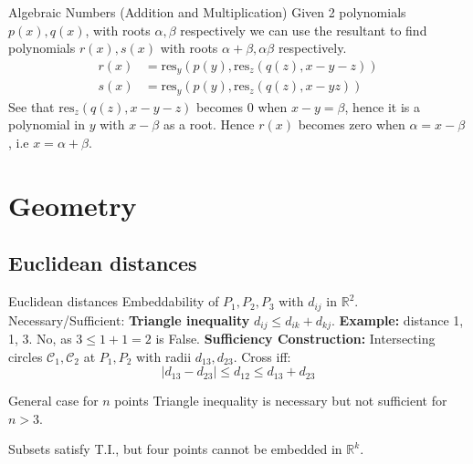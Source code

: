 \documentclass{beamer}
\begin{document}
\begin{frame}{Algebraic Numbers (Addition and Multiplication)}
    Given 2 polynomials $p(x), q(x)$, with roots $\alpha, \beta$ respectively we can use the resultant to find polynomials $r(x), s(x)$ with roots $\alpha + \beta, \alpha\beta$ respectively.
    \begin{align*}
        r(x) & = \text{res}_{y}\left(p(y),\text{res}_{z}(q(z),x-y-z)\right) \\
        s(x) & = \text{res}_{y}(p(y),\text{res}_{z}(q(z),x-yz))
    \end{align*}
    See that $\text{res}_{z}(q(z),x-y-z)$ becomes 0 when $x-y = \beta$, hence it is a polynomial in $y$ with $x-\beta$ as a root. Hence $r(x)$ becomes zero when $\alpha = x- \beta$, i.e $x = \alpha + \beta$.
\end{frame}

\section{Geometry}
\subsection{Euclidean distances}
\begin{frame}{Euclidean distances}
    Embeddability of $P_1, P_2, P_3$ with $d_{ij}$ in $\mathbb{R}^2$.
    \vfill
    Necessary/Sufficient: \textbf{Triangle inequality} $d_{ij} \le d_{ik} + d_{kj}$.
    \vfill
    \textbf{Example:} distance 1, 1, 3. No, as $3 \le 1+1=2$ is False.
    \vfill
    \textbf{Sufficiency Construction:} Intersecting circles $\mathcal{C}_1, \mathcal{C}_2$ at $P_1, P_2$ with radii $d_{13}, d_{23}$. Cross iff:
    \[ |d_{13} - d_{23}| \le d_{12} \le d_{13} + d_{23} \]
\end{frame}

\begin{frame}[fragile]{General case for $n$ points}
    Triangle inequality is necessary but not sufficient for $n>3$.
    \begin{center}
    \end{center}
    Subsets satisfy T.I., but four points cannot be embedded in $\mathbb{R}^k$.
\end{frame}
\end{document}
